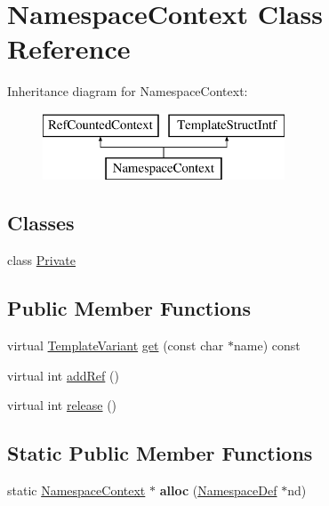 \hypertarget{class_namespace_context}{}\section{Namespace\+Context Class Reference}
\label{class_namespace_context}
Inheritance diagram for Namespace\+Context\+:\begin{figure}[H]
\begin{center}
\leavevmode
\includegraphics[height=2.000000cm]{class_namespace_context}
\end{center}
\end{figure}
\subsection*{Classes}
\begin{DoxyCompactItemize}
\item 
class \mbox{\hyperlink{class_namespace_context_1_1_private}{Private}}
\end{DoxyCompactItemize}
\subsection*{Public Member Functions}
\begin{DoxyCompactItemize}
\item 
virtual \mbox{\hyperlink{class_template_variant}{Template\+Variant}} \mbox{\hyperlink{class_namespace_context_a0747424a5685c3adc549eb331be363c1}{get}} (const char $\ast$name) const
\item 
virtual int \mbox{\hyperlink{class_namespace_context_a796dffc7c1fbe50fc7aeb9c6fd072205}{add\+Ref}} ()
\item 
virtual int \mbox{\hyperlink{class_namespace_context_ab7009613a99e733dd82347c46963808c}{release}} ()
\end{DoxyCompactItemize}
\subsection*{Static Public Member Functions}
\begin{DoxyCompactItemize}
\item 
\mbox{\label{class_namespace_context_a9e82bba7d2da7bef305c2a247f609591}} 
static \mbox{\hyperlink{class_namespace_context}{Namespace\+Context}} $\ast$ {\bfseries alloc} (\mbox{\hyperlink{class_namespace_def}{Namespace\+Def}} $\ast$nd)
\end{DoxyCompactItemize}


